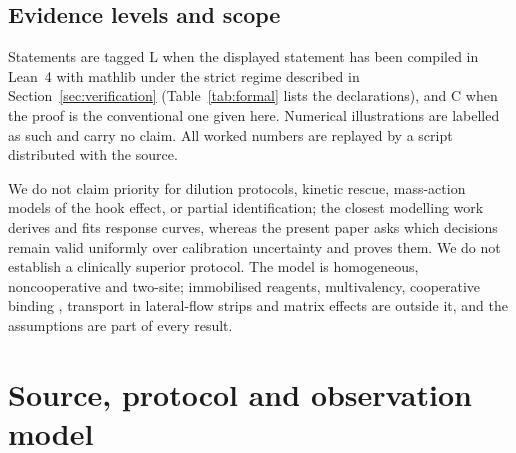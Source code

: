 \documentclass[11pt]{article}
\theoremstyle{plain}
\theoremstyle{definition}
\numberwithin{equation}{section}
\newcommand{\Lean}{\textsf{L}}   %
\newcommand{\Conv}{\textsf{C}}   %
\begin{document}
\subsection{Evidence levels and scope}
Statements are tagged \Lean{} when the displayed statement has been compiled in
Lean~4 with mathlib \cite{demoura2021,mathlib2020} under the strict regime described
in Section~\ref{sec:verification} (Table~\ref{tab:formal} lists the declarations),
and \Conv{} when the proof is the conventional one given here. Numerical
illustrations are labelled as such and carry no claim. All worked numbers are
replayed by a script distributed with the source.

We do not claim priority for dilution protocols, kinetic rescue, mass-action models
of the hook effect, or partial identification; the closest modelling work
\cite{rodbard1978b,fernando1992a,fernando1992b,douglass2013,qian2003} derives and
fits response curves, whereas the present paper asks which decisions remain valid
uniformly over calibration uncertainty and proves them. We do not establish a
clinically superior protocol. The model is homogeneous, noncooperative and
two-site; immobilised reagents, multivalency, cooperative binding \cite{roy2017},
transport in lateral-flow strips \cite{qian2003,ross2020} and matrix effects are
outside it, and the assumptions are part of every result.

\section{Source, protocol and observation model}\label{sec:model}
\end{document}

